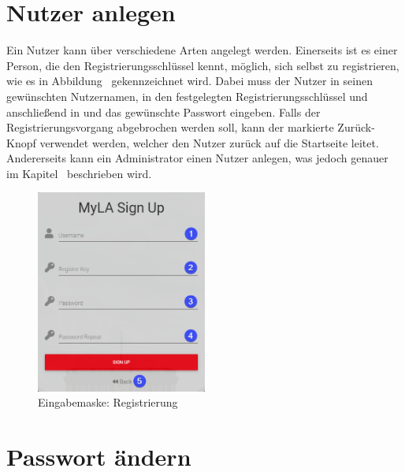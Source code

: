 \section{Nutzer anlegen}
\label{ssec:NutzerAnlegen}

Ein Nutzer kann über verschiedene Arten angelegt werden.
Einerseits ist es einer Person, die den Registrierungsschlüssel kennt, möglich, sich selbst zu registrieren, wie es in Abbildung~ gekennzeichnet wird.
Dabei muss der Nutzer in \desOne seinen gewünschten Nutzernamen, in \desTwo den festgelegten Registrierungsschlüssel und anschließend in \desThree und \desFour das gewünschte Passwort eingeben.
Falls der Registrierungsvorgang abgebrochen werden soll, kann der markierte Zurück-Knopf \desFive verwendet werden, welcher den Nutzer zurück auf die Startseite leitet.
Andererseits kann ein Administrator einen Nutzer anlegen, was jedoch genauer im Kapitel~ beschrieben wird.

\begin{figure}[H]
	\centering
	\includegraphics[width=0.5\textwidth, keepaspectratio]{img/guide/Register.png}
	\captionsetup{justification=centering, format=plain}
	\caption[Eingabemaske: Registrierung]{Eingabemaske: Registrierung \\\quelleScreenshot}
	\label{fig:Register}
\end{figure}

\section{Passwort ändern}

